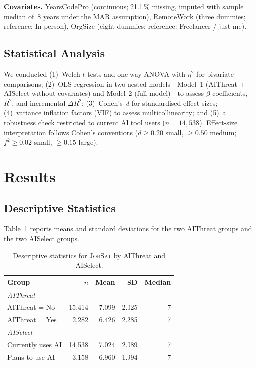 \documentclass[11pt]{article}
\begin{document}
\textbf{Covariates.} YearsCodePro (continuous; 21.1\,\% missing, imputed with
sample median of~8 years under the MAR assumption), RemoteWork (three dummies;
reference: In-person), OrgSize (eight dummies; reference: Freelancer / just me).

\subsection{Statistical Analysis}

We conducted (1)~Welch $t$-tests and one-way ANOVA with $\eta^2$ for bivariate
comparisons; (2)~OLS regression in two nested models---Model~1 (AIThreat +
AISelect without covariates) and Model~2 (full model)---to assess $\beta$
coefficients, $R^2$, and incremental $\Delta R^2$; (3)~Cohen's~$d$ for
standardised effect sizes; (4)~variance inflation factors (VIF) to assess
multicollinearity; and (5)~a robustness check restricted to current AI tool
users ($n = 14{,}538$). Effect-size interpretation follows Cohen's conventions
($d \geq 0.20$ small, $\geq 0.50$ medium; $f^2 \geq 0.02$ small, $\geq 0.15$ large).

\section{Results}

\subsection{Descriptive Statistics}

Table~\ref{tab:descriptives} reports means and standard deviations for the
two AIThreat groups and the two AISelect groups.

\begin{table}[h]
\centering
\caption{Descriptive statistics for \textsc{JobSat} by AIThreat and AISelect.}
\label{tab:descriptives}
\small
\begin{tabular}{lrrrr}
\toprule
Group & $n$ & Mean & SD & Median \\
\midrule
\multicolumn{5}{l}{\textit{AIThreat}} \\
AIThreat = No  & 15{,}414 & 7.099 & 2.025 & 7 \\
AIThreat = Yes &  2{,}282 & 6.426 & 2.285 & 7 \\
\midrule
\multicolumn{5}{l}{\textit{AISelect}} \\
Currently uses AI   & 14{,}538 & 7.024 & 2.089 & 7 \\
Plans to use AI     &  3{,}158 & 6.960 & 1.994 & 7 \\
\bottomrule
\end{tabular}
\end{table}
\end{document}
